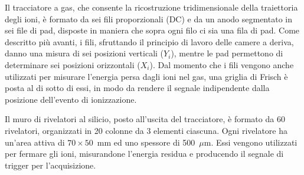 Il tracciatore a gas, che consente la ricostruzione tridimensionale della traiettoria degli ioni, è formato da sei fili proporzionali (DC) e da un anodo segmentato in sei file di pad, disposte in maniera che sopra ogni filo ci sia una fila di pad.
Come descritto più avanti, i fili, sfruttando il principio di lavoro delle camere a deriva, danno una misura di sei posizioni verticali ($Y_i$), mentre le pad permettono di determinare sei posizioni orizzontali ($X_i$).
Dal momento che i fili vengono anche utilizzati per misurare l'energia persa dagli ioni nel gas, una griglia di Frisch è posta al di sotto di essi, in modo da rendere il segnale indipendente dalla posizione dell'evento di ionizzazione.




Il muro di rivelatori al silicio, posto all'uscita del tracciatore, è formato da 60 rivelatori, organizzati in 20 colonne da 3 elementi ciascuna. 
Ogni rivelatore ha un'area attiva di $70 \times 50$~mm ed uno spessore di 500~$\mu$m.
Essi vengono utilizzati per fermare gli ioni, misurandone l'energia residua e producendo il segnale di trigger per l'acquisizione. 

